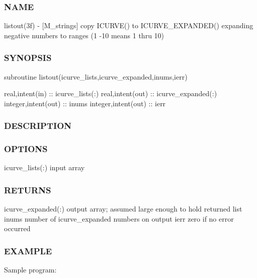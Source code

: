 \subsubsection*{N\+A\+ME}

listout(3f) -\/ \mbox{[}M\+\_\+strings\mbox{]} copy I\+C\+U\+R\+V\+E() to I\+C\+U\+R\+V\+E\+\_\+\+E\+X\+P\+A\+N\+D\+E\+D() expanding negative numbers to ranges (1 -\/10 means 1 thru 10) 

\subsubsection*{S\+Y\+N\+O\+P\+S\+IS}

subroutine listout(icurve\+\_\+lists,icurve\+\_\+expanded,inums,ierr)

real,intent(in) \+:\+: icurve\+\_\+lists(\+:) real,intent(out) \+:\+: icurve\+\_\+expanded(\+:) integer,intent(out) \+:\+: inums integer,intent(out) \+:\+: ierr

\subsubsection*{D\+E\+S\+C\+R\+I\+P\+T\+I\+ON}

\subsubsection*{O\+P\+T\+I\+O\+NS}

icurve\+\_\+lists(\+:) input array

\subsubsection*{R\+E\+T\+U\+R\+NS}

icurve\+\_\+expanded(\+:) output array; assumed large enough to hold returned list inums number of icurve\+\_\+expanded numbers on output ierr zero if no error occurred

\subsubsection*{E\+X\+A\+M\+P\+LE}

Sample program\+:

